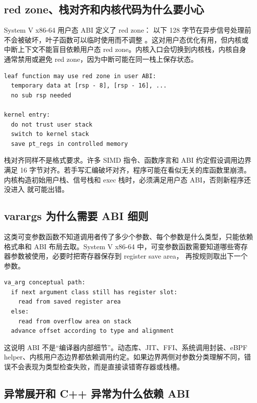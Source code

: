 \subsection{red zone、栈对齐和内核代码为什么要小心}

System V x86-64 用户态 ABI 定义了 red zone： 以下 128 字节在异步信号处理前不会被破坏，叶子函数可以临时使用而不调整 。这对用户态优化有用，但内核或中断上下文不能盲目依赖用户态 red zone。内核入口会切换到内核栈，内核自身通常禁用或避免 red zone，因为中断可能在同一栈上保存状态。

\begin{lstlisting}
leaf function may use red zone in user ABI:
  temporary data at [rsp - 8], [rsp - 16], ...
  no sub rsp needed

kernel entry:
  do not trust user stack
  switch to kernel stack
  save pt_regs in controlled memory
\end{lstlisting}

栈对齐同样不是格式要求。许多 SIMD 指令、函数序言和 ABI 约定假设调用边界满足 16 字节对齐。若手写汇编破坏对齐，程序可能在看似无关的库函数里崩溃。内核构造初始用户栈、信号栈和 exec 栈时，必须满足用户态 ABI，否则新程序还没进入  就可能出错。

\subsection{varargs 为什么需要 ABI 细则}

 这类可变参数函数不知道调用者传了多少个参数、每个参数是什么类型，只能依赖格式串和 ABI 布局去取。System V x86-64 中，可变参数函数需要知道哪些寄存器参数被使用，必要时把寄存器保存到 register save area， 再按规则取出下一个参数。

\begin{lstlisting}
va_arg conceptual path:
  if next argument class still has register slot:
    read from saved register area
  else:
    read from overflow area on stack
  advance offset according to type and alignment
\end{lstlisting}

这说明 ABI 不是“编译器内部细节”。动态库、JIT、FFI、系统调用封装、eBPF helper、内核用户态边界都依赖调用约定。如果边界两侧对参数分类理解不同，错误不会表现为类型检查失败，而是直接读错寄存器或栈槽。

\subsection{异常展开和 C++ 异常为什么依赖 ABI}

